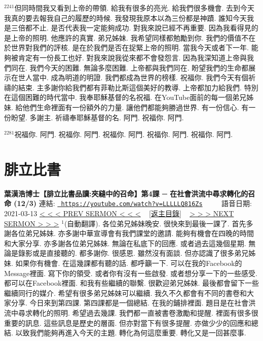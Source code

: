 \documentclass{book}
\begin{document}
$^{2241}$但同時間我又看到上帝的帶領.
給我有很多的亮光.
給我們很多機會.
去到今天我真的要去報我自己的履歷的時候.
我發現我原本以為三份都是神蹟.
誰知今天我是三倍都不止.
是否代表我一定能夠成功.
對我來說已經不再重要.
因為我看得見的是上帝的照明.
他應許的真實.
弟兄姊妹.
我希望同樣都勉勵到你.
我們的價值不在於世界對我們的評核.
是在於我們是否在捉緊上帝的照明.
當我今天或者下一年.
能夠被肯定有一份長工也好.
對我來說我從來都不會發怨言.
因為我深知道上帝與我們同在.
我們今天的困難.
無論多麼困難.
上帝都與我們同在.
盼望我們的生命都展示在世人當中.
成為明道的明證.
我們都成為世界的榜樣.
祝福你.
我們今天有個祈禱的結束.
主多謝你給我們都有菲勒比斯這個美好的教導.
上帝都加力給我們.
特別在這個困難的時代當中.
我奉耶穌基督的名祝福.
在YouTube面前的每一個弟兄姊妹.
給他們生命裡面有一份額外的力量.
讓他們都能夠勝過世界.
有一份信心.
有一份盼望.
多謝主.
祈禱奉耶穌基督的名.
阿門.
祝福你.
阿門.

$^{2281}$祝福你.
阿門.
祝福你.
阿門.
祝福你.
阿門.
祝福你.
阿門.
祝福你.
阿門.
\newpage



\section{腓立比書}
\label{sec:LLLLLQ816Zs}
\textbf{葉漢浩博士【腓立比書品讀:夾縫中的召命】第4課 ─ 在社會洪流中尋求轉化的召命 (12/3)}
\newline
\newline
連結: \href{https://youtube.com/watch?v=LLLLLQ816Zs}{\texttt{ https://youtube.com/watch?v=LLLLLQ816Zs}} ~~~~ 語音日期: 2021-03-13 
\newline
\newline
\hyperref[sec:Y_0nqRPjKNA]{\small{< < < PREV SERMON < < <}}
~
\hyperref[sec:index]{\small{[返主目錄]}}
~
\hyperref[sec:SEh8cg_SNkc]{\small{> > > NEXT SERMON > > >}}
\newline
\newline
$^{1}$(自動翻譯).
各位弟兄姊妹晚安.
很快來到最後一課了.
首先多謝各位弟兄姊妹.
亦多謝中華宣導會有我們課堂的邀請.
能夠有機會在四晚的時間和大家分享.
亦多謝各位弟兄姊妹.
無論在私底下的回應.
或者過去這幾個星期.
無論是錄影或是直接聽的.
都多謝你.
很感恩.
雖然沒有面談.
但亦認識了很多弟兄姊妹.
如果你有機會.
在這幾課都有聽的話.
都呼籲一下.
可以在我的Facebook的Message裡面.
寫下你的領受.
或者你有沒有一些啟發.
或者想分享一下的一些感受.
都可以在Facebook裡面.
和我有些繼續的聯繫.
很歡迎弟兄姊妹.
最後都會留下一些繼續同行的媒介.
希望有很多弟兄姊妹可以繼續.
我久不久都會有不同的書卷和大家分享.
今日來到第四課.
第四課都是一個總結.
在我的鋪排裡面.
題目是在社會洪流中尋求轉化的照明.
希望過去幾課.
我們都一直被書卷激勵和提醒.
裡面有很多很重要的訊息.
這些訊息是歷史的層面.
但亦對當下有很多提醒.
亦做少少的回應和總結.
以致我們能夠再進入今天的主題.
轉化為何這麼重要.
轉化又是一回甚麼事.
\end{document}
